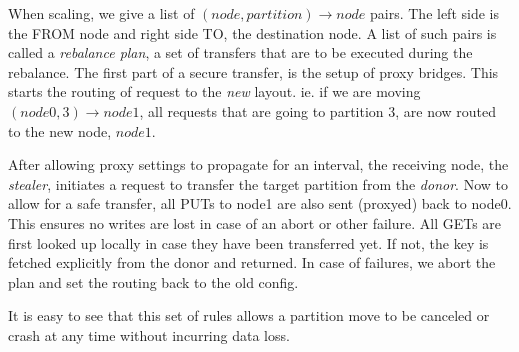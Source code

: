 When scaling, we give a list of $(node, partition) \rightarrow node$ pairs. The left side is the FROM node and right side TO, the destination node.
A list of such pairs is called a \emph{rebalance plan}, a set of transfers that are to be executed during the rebalance.
The first part of a secure transfer, is the setup of proxy bridges. This starts the routing of request to the \emph{new} layout. ie. if we are moving $(node0, 3) \rightarrow node1$, all requests that are going to partition 3, are now routed to the new node, $node1$. 

After allowing proxy settings to propagate for an interval, the receiving node, the \emph{stealer}, initiates a request to transfer the target partition from the \emph{donor}. 
Now to allow for a safe transfer, all PUTs to node1 are also sent (proxyed) back to node0. This ensures no writes are lost in case of an abort or other failure. All GETs are first looked up locally in case they have been transferred yet. If not, the key is fetched explicitly from the donor and returned.
In case of failures, we abort the plan and set the routing back to the old config.

It is easy to see that this set of rules allows a partition move to be canceled or crash at any time without incurring data loss.










